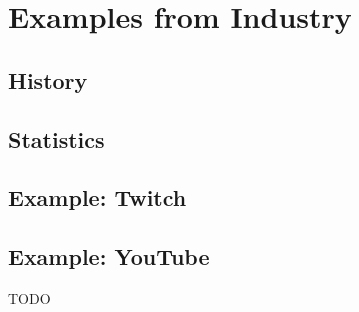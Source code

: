 
\chapter{Examples from Industry}\label{chapter:introduction}

\section{History}

\section{Statistics}

\section{Example: Twitch}

\section{Example: YouTube}

TODO